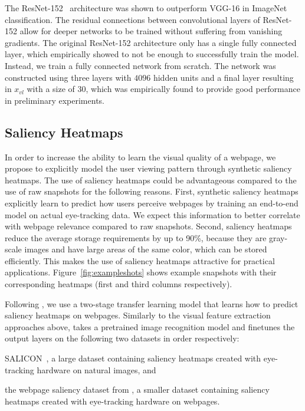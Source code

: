 The ResNet-152~\cite{he2016deep} architecture was shown to outperform VGG-16 in ImageNet classification.
The residual connections between convolutional layers of ResNet-152 allow for deeper networks to be trained without suffering from vanishing gradients.
The original ResNet-152 architecture only has a single fully connected layer, which empirically showed to not be enough to successfully train the model.
Instead, we train a fully connected network from scratch.
The network was constructed using three layers with $4096$ hidden units and a final layer resulting in $x_{vl}$ with a size of $30$, which was empirically found to provide good performance in preliminary experiments.


\subsection{Saliency Heatmaps} \label{sec:saliency}
In order to increase the ability to learn the visual quality of a webpage, we propose to explicitly model the user viewing pattern through synthetic saliency heatmaps.
The use of saliency heatmaps could be advantageous compared to the use of raw snapshots for the following reasons.
First, synthetic saliency heatmaps explicitly learn to predict how users perceive webpages by training an end-to-end model on actual eye-tracking data.
We expect this information to better correlate with webpage relevance compared to raw snapshots.
Second, saliency heatmaps reduce the average storage requirements by up to 90\%,
because they are gray-scale images and have large areas of the same color, which can be stored efficiently.
This makes the use of saliency heatmaps attractive for practical applications.
Figure~\ref{fig:exampleshots} shows example snapshots with their corresponding heatmaps (first and third columns respectively).

Following \cite{shan2017two}, we use a two-stage transfer learning model that learns how to predict saliency heatmaps on webpages.
Similarly to the visual feature extraction approaches above, \cite{shan2017two} takes a pretrained image recognition model and finetunes the output layers on the following two datasets in order respectively:
\begin{inparaenum}[(i)]
\item SALICON~\cite{jiang2015salicon}, a large dataset containing saliency heatmaps created with eye-tracking hardware on natural images, and 
\item the webpage saliency dataset from \cite{shen2014webpage}, a smaller dataset containing saliency heatmaps created with eye-tracking hardware on webpages.
\end{inparaenum}

